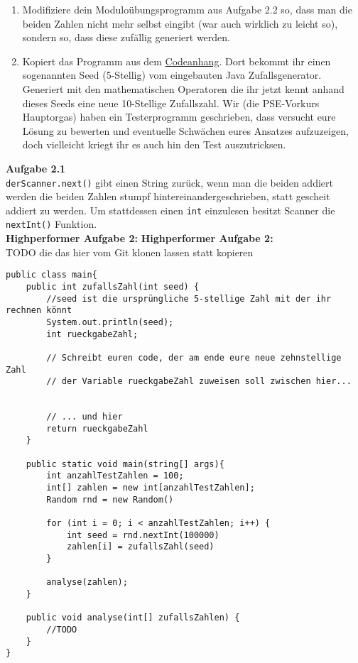 \documentclass{../../sheet}
\begin{document}
\begin{enumerate}
    \item Modifiziere dein Moduloübungsprogramm aus Aufgabe 2.2 so, dass man die beiden Zahlen nicht mehr selbst eingibt (war auch wirklich zu leicht so), sondern so, dass diese zufällig generiert werden.
    \item Kopiert das Programm aus dem \hyperlink{Aufgabe_2.2}{Codeanhang}. Dort bekommt ihr einen sogenannten Seed (5-Stellig) vom eingebauten Java Zufallsgenerator. Generiert mit den mathematischen Operatoren die ihr jetzt kennt anhand dieses Seeds eine neue 10-Stellige Zufallszahl. Wir (die PSE-Vorkurs Hauptorgas) haben ein Testerprogramm geschrieben, dass versucht eure Lösung zu bewerten und eventuelle Schwächen eures Ansatzes aufzuzeigen, doch vielleicht kriegt ihr es auch hin den Test auszutricksen.
\end{enumerate}

\newpage
{}
\hypertarget{Aufgabe_2.1}{}
\textbf{Aufgabe 2.1}\\
\texttt{derScanner.next()} gibt einen String zurück, wenn man die beiden addiert werden die beiden Zahlen stumpf hintereinandergeschrieben, statt gescheit addiert zu werden. Um stattdessen einen \texttt{int} einzulesen besitzt Scanner die \texttt{nextInt()} Funktion.\\
\textbf{Highperformer Aufgabe 2:}
\hypertarget{Aufgabe_2.2}{}
\textbf{Highperformer Aufgabe 2:}
\\TODO die das hier vom Git klonen lassen statt kopieren
\begin{verbatim}
public class main{
    public int zufallsZahl(int seed) {
        //seed ist die ursprüngliche 5-stellige Zahl mit der ihr rechnen könnt
        System.out.println(seed);
        int rueckgabeZahl;

        // Schreibt euren code, der am ende eure neue zehnstellige Zahl
        // der Variable rueckgabeZahl zuweisen soll zwischen hier...


        // ... und hier
        return rueckgabeZahl
    }

    public static void main(string[] args){
        int anzahlTestZahlen = 100;
        int[] zahlen = new int[anzahlTestZahlen];
        Random rnd = new Random()

        for (int i = 0; i < anzahlTestZahlen; i++) {
            int seed = rnd.nextInt(100000)
            zahlen[i] = zufallsZahl(seed)
        }

        analyse(zahlen);
    }

    public void analyse(int[] zufallsZahlen) {
        //TODO
    }
}
\end{verbatim}
\end{document}
